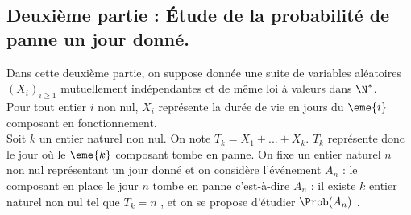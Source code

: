\subsection*{Deuxième partie : Étude de la probabilité de 
panne un jour donné.}
\noindent
Dans cette deuxième partie, on suppose donnée une suite de variables
aléatoires $(X_i)_{i \geq 1}$ mutuellement indépendantes et de même
loi à valeurs dans $\N^*$.\\
Pour tout entier $i$ non nul, $X_i$ représente la durée de vie en
jours du $\eme{i}$ composant en fonctionnement.\\
Soit $k$ un entier naturel non nul. On note $T_k= X_1+...+X_k$. $T_k$
représente donc le jour où le $\eme{k}$ composant tombe en panne. On
fixe un entier naturel $n$ non nul représentant un jour donné et on
considère l'événement $A_n$ : \og le composant en place le jour $n$
tombe en panne \fg{} c'est-à-dire $A_n$ : \og il existe $k$ entier
naturel non nul tel que $T_k=n$ \fg{}, et on se propose d'étudier
$\Prob(A_n)$ .

